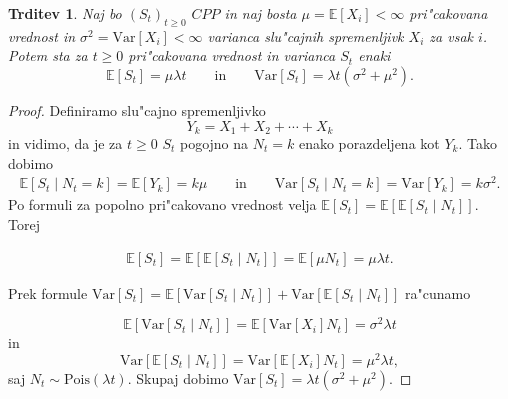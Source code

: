 \documentclass[12pt, a4paper, reqno]{amsart}
\theoremstyle{definition} %
\theoremstyle{plain} %
\newtheorem{trditev}[definicija]{Trditev}
\newcommand{\E}{\mathbb{E}}
\newcommand{\1}{\mathds{1}}
\newcommand{\Pois}[1]{\text{Pois}(#1)}
\newcommand{\Var}[1]{\text{Var}\left[#1\right]}
\begin{document}
        \begin{trditev}
            Naj bo $(S_t)_{t\geq 0}$ $CPP$ in naj bosta $\mu = \E\left[X_i\right] < \infty$ 
            pri"cakovana vrednost in $\sigma^2= \Var{X_i} <\infty$ varianca
            slu"cajnih spremenljivk $X_i$ za vsak $i$. Potem sta za $t\geq0$ pri"cakovana vrednost in 
            varianca $S_t$ enaki 
            \begin{equation*}
                \E\left[S_t\right] = \mu\lambda t \qquad \text{in} \qquad \Var{S_t} = \lambda t\left(\sigma^2 + \mu^2\right).
            \end{equation*}
            \label{trd:PricVarCPP}
        \end{trditev}

        \begin{proof}

            Definiramo slu"cajno spremenljivko
            \begin{equation}
                Y_k = X_1 + X_2 + \cdots + X_k
                \label{eq:Y_k}
            \end{equation}
            in vidimo, da je za $t\geq0$ $S_t$ pogojno na $N_t = k$ enako porazdeljena 
            kot $Y_k$. Tako dobimo 
            \begin{align*}
            \E\left[S_t\mid N_t = k\right] = \E\left[Y_k\right] = k\mu \qquad \text{in} \qquad
            \Var{S_t\mid N_t = k} = \Var{Y_k} = k\sigma^2.
            \end{align*}
            Po formuli za popolno pri"cakovano vrednost velja 
            $\E\left[S_t\right] = \E\left[\E\left[S_t\mid N_t\right]\right]$. Torej

            \begin{align*}
                \E\left[S_t\right] = \E\left[\E\left[S_t\mid N_t\right]\right] = \E\left[\mu N_t\right] = \mu\lambda t.
            \end{align*}

            \noindent
            Prek formule $\Var{S_t} = \E\left[\Var{S_t\mid N_t}\right] + \Var{\E\left[S_t\mid N_t\right]}$ ra"cunamo 

            \begin{equation*}
                \E\left[\Var{S_t\mid N_t}\right] = \E\left[\Var{X_i}N_t\right] = \sigma^2\lambda t
            \end{equation*}
            in 
            \begin{equation*}
                \Var{\E\left[S_t\mid N_t\right]} = \Var{\E\left[X_i\right]N_t} = \mu^2\lambda t,
            \end{equation*}
            saj $N_t\sim\Pois{\lambda t}$. Skupaj dobimo $\Var{S_t} = \lambda t\left(\sigma^2 + \mu^2\right)$.
        \end{proof}
\end{document}
